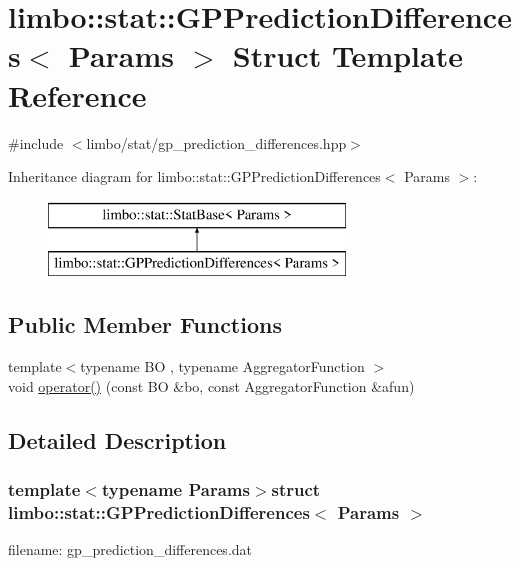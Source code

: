 \hypertarget{structlimbo_1_1stat_1_1_g_p_prediction_differences}{}\section{limbo\+:\+:stat\+:\+:G\+P\+Prediction\+Differences$<$ Params $>$ Struct Template Reference}
\label{structlimbo_1_1stat_1_1_g_p_prediction_differences}


{\ttfamily \#include $<$limbo/stat/gp\+\_\+prediction\+\_\+differences.\+hpp$>$}

Inheritance diagram for limbo\+:\+:stat\+:\+:G\+P\+Prediction\+Differences$<$ Params $>$\+:\begin{figure}[H]
\begin{center}
\leavevmode
\includegraphics[height=2.000000cm]{structlimbo_1_1stat_1_1_g_p_prediction_differences}
\end{center}
\end{figure}
\subsection*{Public Member Functions}
\begin{DoxyCompactItemize}
\item 
{\footnotesize template$<$typename B\+O , typename Aggregator\+Function $>$ }\\void \hyperlink{structlimbo_1_1stat_1_1_g_p_prediction_differences_a91a2d59457d83adbbfa6138db9e200cd}{operator()} (const B\+O \&bo, const Aggregator\+Function \&afun)
\end{DoxyCompactItemize}


\subsection{Detailed Description}
\subsubsection*{template$<$typename Params$>$struct limbo\+::stat\+::\+G\+P\+Prediction\+Differences$<$ Params $>$}

filename\+: {\ttfamily gp\+\_\+prediction\+\_\+differences.\+dat} 

